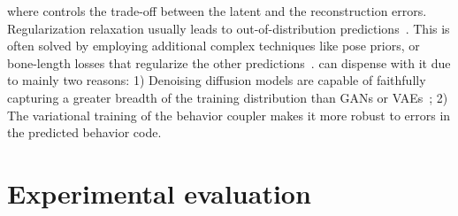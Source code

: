 \documentclass[10pt,twocolumn,letterpaper]{article}
\begin{document}
\iffalse \vspace{-0.2cm}

\fi

where  controls the trade-off between the latent and the reconstruction errors. Regularization relaxation usually leads to out-of-distribution predictions~\cite{mao2021gsps}. This is often solved by employing additional complex techniques like pose priors, or bone-length losses that regularize the other predictions~\cite{mao2021gsps,bie2022hitdvae}. \modelname{} can dispense with it due to mainly two reasons: 1) Denoising diffusion models are capable of faithfully capturing a greater breadth of the training distribution than GANs or VAEs~\cite{dhariwal2021diffusionbeatsgans}; 2) The variational training of the behavior coupler makes it more robust to errors in the predicted behavior code. 
\section{Experimental evaluation}
\label{sec:experimental_setup}
\end{document}
